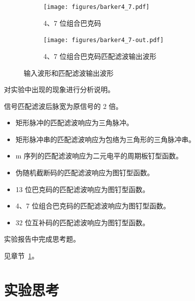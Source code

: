 \documentclass[../main]{subfiles}
\begin{document}
\begin{figure}[htbp]
  \begin{subfigure}[htbp]{0.23\linewidth}
    \centering
    \texttt{[image: figures/barker4\_7.pdf]}
    \caption{4、7 位组合巴克码}%
    \label{fig:barker4_7_}
  \end{subfigure}
  \quad
  \begin{subfigure}[htbp]{0.23\linewidth}
    \centering
    \texttt{[image: figures/barker4\_7-out.pdf]}
    \caption{4、7 位组合巴克码匹配滤波输出波形}%
    \label{fig:barker4_7-out_}
  \end{subfigure}
  \caption{输入波形和匹配滤波输出波形}%
  \label{fig:mf_}
\end{figure}


\begin{Exercise}
  对实验中出现的现象进行分析说明。
\end{Exercise}

\begin{Answer}
  信号匹配滤波后脉宽为原信号的 2 倍。

  \begin{itemize}
    \item 矩形脉冲的匹配滤波响应为三角脉冲。
    \item 矩形脉冲串的匹配滤波响应为包络为三角形的三角脉冲串。
    \item m 序列的匹配滤波响应为二元电平的周期板钉型函数。
    \item 伪随机截断码的匹配滤波响应为图钉型函数。
    \item 13 位巴克码的匹配滤波响应为图钉型函数。
    \item 4、7 位组合巴克码的匹配滤波响应为图钉型函数。
    \item 32 位互补码的匹配滤波响应为图钉型函数。
  \end{itemize}
\end{Answer}

\begin{Exercise}
  实验报告中完成思考题。
\end{Exercise}

\begin{Answer}
  见章节~\ref{sec:\arabic{chapter}thought}。
\end{Answer}

\section{实验思考}%
\label{sec:\arabic{chapter}thought}
\end{document}
